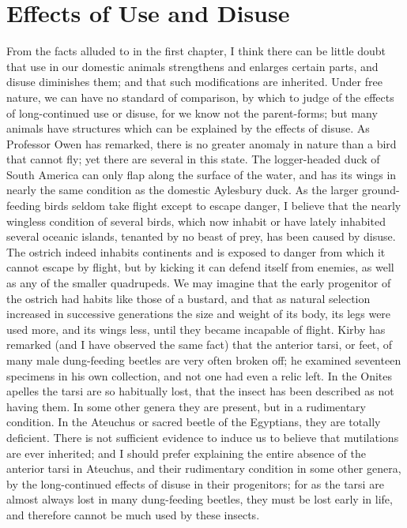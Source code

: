 \section{Effects of Use and Disuse}
From the facts alluded to in the first chapter, I think there can be little doubt that use in our domestic animals strengthens and enlarges certain parts, and disuse diminishes them; and that such modifications are inherited. Under free nature, we can have no standard of comparison, by which to judge of the effects of long-continued use or disuse, for we know not the parent-forms; but many animals have structures which can be explained by the effects of disuse. As Professor Owen has remarked, there is no greater anomaly in nature than a bird that cannot fly; yet there are several in this state. The logger-headed duck of South America can only flap along the surface of the water, and has its wings in nearly the same condition as the domestic Aylesbury duck. As the larger ground-feeding birds seldom take flight except to escape danger, I believe that the nearly wingless condition of several birds, which now inhabit or have lately inhabited several oceanic islands, tenanted by no beast of prey, has been caused by disuse. The ostrich indeed inhabits continents and is exposed to danger from which it cannot escape by flight, but by kicking it can defend itself from enemies, as well as any of the smaller quadrupeds. We may imagine that the early progenitor of the ostrich had habits like those of a bustard, and that as natural selection increased in successive generations the size and weight of its body, its legs were used more, and its wings less, until they became incapable of flight.
Kirby has remarked (and I have observed the same fact) that the anterior tarsi, or feet, of many male dung-feeding beetles are very often broken off; he examined seventeen specimens in his own collection, and not one had even a relic left. In the Onites apelles the tarsi are so habitually lost, that the insect has been described as not having them. In some other genera they are present, but in a rudimentary condition. In the Ateuchus or sacred beetle of the Egyptians, they are totally deficient. There is not sufficient evidence to induce us to believe that mutilations are ever inherited; and I should prefer explaining the entire absence of the anterior tarsi in Ateuchus, and their rudimentary condition in some other genera, by the long-continued effects of disuse in their progenitors; for as the tarsi are almost always lost in many dung-feeding beetles, they must be lost early in life, and therefore cannot be much used by these insects.
